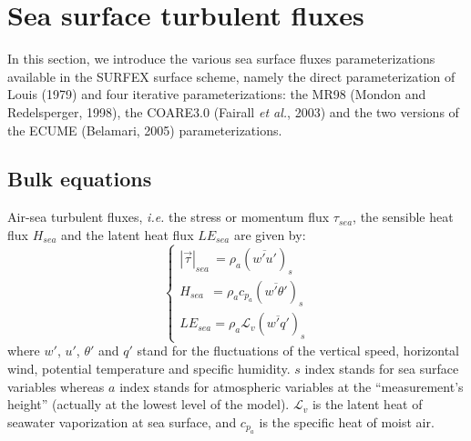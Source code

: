 
\clearpage
\section{Sea surface turbulent fluxes}
In this section, we introduce the various sea surface fluxes parameterizations available in the SURFEX surface scheme, namely
the direct parameterization of Louis (1979) and four iterative parameterizations:
the MR98 (Mondon and Redelsperger, 1998), the COARE3.0 (Fairall \textit{et al.}, 2003\nocite{Fairall2003}) and the two versions of 
the ECUME (Belamari, 2005\nocite{belamari2005}) parameterizations. 

\subsection{Bulk equations\label{sct_EQUA}}
Air-sea turbulent fluxes, \textit{i.e.} the stress or momentum flux $\tau_{sea}$, the sensible heat flux $H_{sea}$ and the latent heat flux $LE_{sea}$ are given by: 
\begin{equation}
\left\{
\begin{array}{l}
	|\vec{\tau}|_{sea}~=\rho_{a} (\overline{w'u'})_{s}\\
	H_{sea}~~=\rho_{a}c_{p_{a}}(\overline{w'\theta '})_{s}\\
	LE_{sea}=\rho_{a}\mathcal{L}_{v}(\overline{w'q'})_{s}
\end{array}
\right.
\label{eq_flxturb}\end{equation}
where $w'$, $u'$, $\theta '$ and $q '$ stand for the fluctuations of the vertical speed, horizontal wind, potential temperature and specific humidity.
$s$ index stands for sea surface variables whereas $a$ index stands for atmospheric variables at the ``measurement's height'' (actually at the lowest level of the model).
${\mathcal{L}}_{v}$ is the latent heat of seawater vaporization at sea surface, and $c_{p_{a}}$ is the specific heat of moist air.

